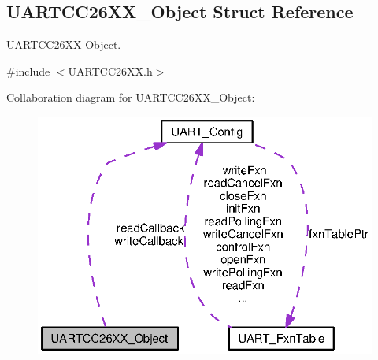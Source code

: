 \subsection{U\-A\-R\-T\-C\-C26\-X\-X\-\_\-\-Object Struct Reference}
\label{struct_u_a_r_t_c_c26_x_x___object}


U\-A\-R\-T\-C\-C26\-X\-X Object.  




{\ttfamily \#include $<$U\-A\-R\-T\-C\-C26\-X\-X.\-h$>$}



Collaboration diagram for U\-A\-R\-T\-C\-C26\-X\-X\-\_\-\-Object\-:
\nopagebreak
\begin{figure}[H]
\begin{center}
\leavevmode
\includegraphics[width=323pt]{struct_u_a_r_t_c_c26_x_x___object__coll__graph}
\end{center}
\end{figure}
